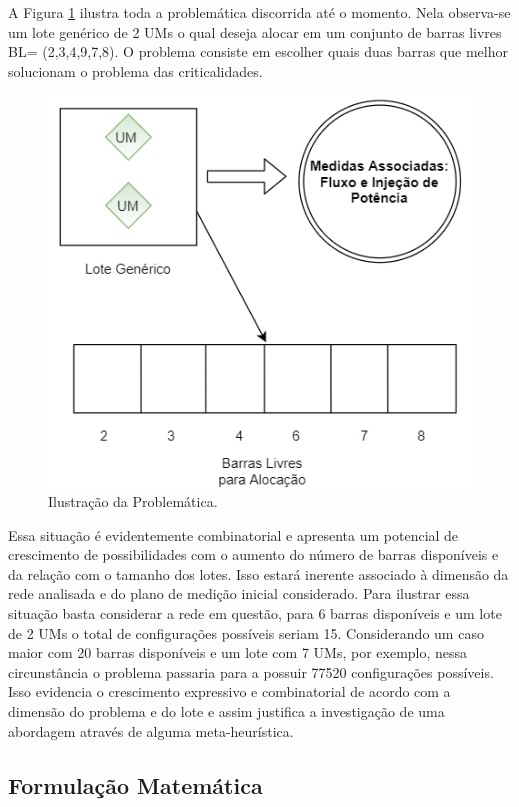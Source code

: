 \documentclass[12pt]{article}
\begin{document}
	A Figura \ref{fig4} ilustra toda a problemática discorrida até o momento. Nela observa-se um lote genérico de 2 UMs o qual deseja alocar em um conjunto de barras livres BL= (2,3,4,9,7,8). O problema consiste em escolher quais duas barras que melhor solucionam o problema das criticalidades. 
	
	\begin{figure}[H]
		\centering 
		\includegraphics[scale=0.8]{figuras/UMs_aloc.jpg}
		\caption{Ilustração da Problemática.}
		\label{fig4} %
	\end{figure}
	
	Essa situação é evidentemente combinatorial e apresenta um potencial de crescimento de possibilidades com o aumento do número de barras disponíveis e da relação com o tamanho dos lotes. Isso estará inerente associado à dimensão da rede analisada e do plano de medição inicial considerado. Para ilustrar essa situação basta considerar a rede em questão, para 6 barras disponíveis e um lote de 2 UMs o total de configurações possíveis seriam 15. Considerando um caso maior com 20 barras disponíveis e um lote com 7 UMs, por exemplo, nessa circunstância o problema passaria para a possuir 77520 configurações possíveis. Isso evidencia o crescimento expressivo e combinatorial de acordo com a dimensão do problema e do lote e assim justifica a investigação de uma abordagem através de alguma meta-heurística.
	

\subsection{Formulação Matemática}	
\end{document}
